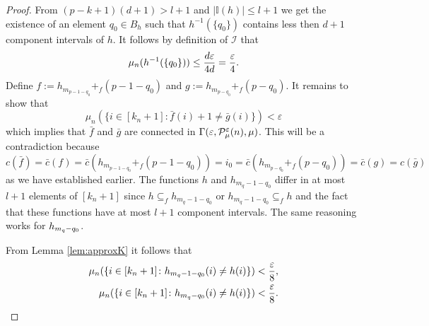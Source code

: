 \begin{proof}
  From $(p-k+1)(d+1) > l+1$ and $\left|\mathbb{I}(h)\right| \leq l+1$ we get the existence of an element $q_0 \in B_h$ such that $h^{-1}(\{q_0\})$ contains less then $d+1$ component intervals of $h$.
  It follows by definition of $\mathcal{I}$ that
  \begin{equation}\label{eq:hq0}
    \mu_n(h^{-1}(\{q_0\})) \leq {d \varepsilon \over 4d} = {\varepsilon \over 4}.
  \end{equation}
  Define $f:= h_{m_{p-1-q_0}} +_f (p-1-q_0)$ and $g:= h_{m_{p-q_0}}+_f (p-q_0)$. It remains to show that
  \begin{equation}\label{eq:cl}
    \mu_n(\{i \in [k_n+1]\colon \bar{f}(i) + 1\neq \bar{g}(i)\}) < \varepsilon
  \end{equation}
  which implies that $\bar{f}$ and $\bar{g}$ are connected in $\Gamma(\varepsilon, \P_\mu^\varepsilon(n), \mu)$. This will be a contradiction because \[c(\bar{f}) = \bar{c}(f) = \bar{c}(h_{m_{p-1-q_0}} +_f (p-1-q_0)) = i_0 = \bar{c}(h_{m_{p-q_0}}+_f (p-q_0)) = \bar{c}(g)= c(\bar{g})\] as we have established earlier.
  The functions $h$ and $h_{m_q-1-q_0}$ differ in at most $l+1$ elements of $[k_n+1]$ since $h \subseteq_f h_{m_q-1-q_0}$ or $h_{m_q-1-q_0} \subseteq_f h$ and the fact that these functions have at most $l+1$ component intervals.
  The same reasoning works for $\hh$.

  From Lemma \ref{lem:approxK} it follows that
  \begin{align}
    \label{eq:h1}\mu_n(\{i\in [k_n+1]\colon \h (i) \neq h(i)\}) < {\varepsilon \over 8}, \\
    \label{eq:h2}\mu_n(\{i\in [k_n+1]\colon \hh (i) \neq h(i)\}) < {\varepsilon \over 8}. 
  \end{align}


\end{proof}
